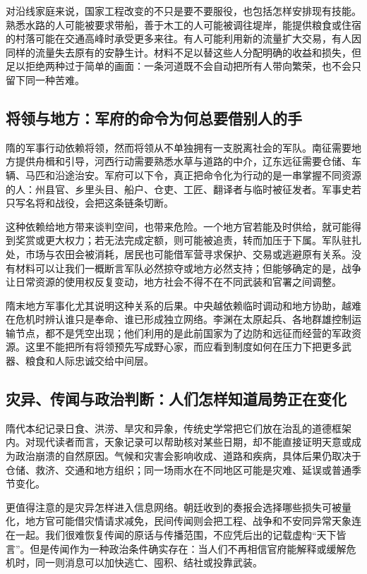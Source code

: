 对沿线家庭来说，国家工程改变的不只是要不要服役，也包括怎样安排现有技能。熟悉水路的人可能被要求带船，善于木工的人可能被调往堤岸，能提供粮食或住宿的村落可能在交通高峰时承受更多来往。有人可能利用新的流量扩大交易，有人因同样的流量失去原有的安静生计。材料不足以替这些人分配明确的收益和损失，但足以拒绝两种过于简单的画面：一条河道既不会自动把所有人带向繁荣，也不会只留下同一种苦难。

\subsection{将领与地方：军府的命令为何总要借别人的手}
隋的军事行动依赖将领，然而将领从不单独拥有一支脱离社会的军队。南征需要地方提供舟楫和引导，河西行动需要熟悉水草与道路的中介，辽东远征需要仓储、车辆、马匹和沿途治安。军府可以下令，真正把命令化为行动的是一串掌握不同资源的人：州县官、乡里头目、船户、仓吏、工匠、翻译者与临时被征发者。军事史若只写名将和战役，会把这条链条切断。

这种依赖给地方带来谈判空间，也带来危险。一个地方官若能及时供给，就可能得到奖赏或更大权力；若无法完成定额，则可能被追责，转而加压于下属。军队驻扎处，市场与农田会被消耗，居民也可能借军营寻求保护、交易或逃避原有关系。没有材料可以让我们一概断言军队必然掠夺或地方必然支持；但能够确定的是，战争让日常资源的使用权反复变动，地方社会不得不在不同武装和官署之间调整。

隋末地方军事化尤其说明这种关系的后果。中央越依赖临时调动和地方协助，越难在危机时辨认谁只是奉命、谁已形成独立网络。李渊在太原起兵、各地群雄控制运输节点，都不是凭空出现；他们利用的是此前国家为了边防和远征而经营的军政资源。这里不能把所有将领预先写成野心家，而应看到制度如何在压力下把更多武器、粮食和人际忠诚交给中间层。

\subsection{灾异、传闻与政治判断：人们怎样知道局势正在变化}
隋代本纪记录日食、洪涝、旱灾和异象，传统史学常把它们放在治乱的道德框架内。对现代读者而言，天象记录可以帮助核对某些日期，却不能直接证明天意或成为政治崩溃的自然原因。气候和灾害会影响收成、道路和疾病，具体后果仍取决于仓储、救济、交通和地方组织；同一场雨水在不同地区可能是灾难、延误或普通季节变化。

更值得注意的是灾异怎样进入信息网络。朝廷收到的奏报会选择哪些损失可被量化，地方官可能借灾情请求减免，民间传闻则会把工程、战争和不安同异常天象连在一起。我们很难恢复传闻的原话与传播范围，不应凭后出的记载虚构“天下皆言”。但是传闻作为一种政治条件确实存在：当人们不再相信官府能解释或缓解危机时，同一则消息可以加快逃亡、囤积、结社或投靠武装。

